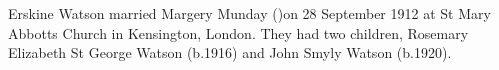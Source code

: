 
Erskine Watson married Margery Munday ()on 28 September 1912 at St Mary Abbotts Church in	Kensington, London.
They had two children, Rosemary Elizabeth St George Watson (b.1916) and John Smyly Watson (b.1920).


